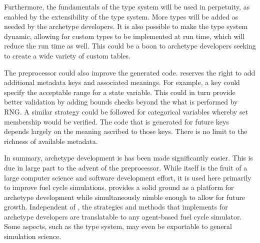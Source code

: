 Furthermore, the fundamentals of the \cyclus type system will be used in
perpetuity, as enabled by the extensibility of the type system.  More types
will be added as needed by the archetype developers.  It is also possible to
make the type system dynamic, allowing for custom types to be implemented at run time,
which will reduce the run time as well.
This could be a boon to archetype developers seeking to create a wide variety of custom
tables.

The preprocessor could also improve the generated code. \Cyclus reserves the right
to add additional metadata keys and associated meanings.  For example, a 
key could specify the acceptable range for a state variable. This could in turn
provide better validation by adding bounds checks beyond the what is performed
by \gls{RNG}. A similar strategy could be followed for categorical variables whereby
set membership would be verified. The code that is generated for future keys
depends largely on the meaning ascribed to those keys. There is no limit
to the richness of available metadata.

In summary, archetype development is has been made significantly easier. This is due in large
part to the advent of the \cyclus preprocessor. While \cycpp itself is the fruit of
a large computer science and software development effort, it is used here
primarily to improve fuel cycle simulations. \cyclus provides a solid ground
as a platform for archetype development while simultaneously nimble enough
to allow for future growth. Independent of \cyclus, the strategies and methods that
\cyclus implements for archetype developers are translatable to any agent-based
fuel cycle simulator.  Some aspects, such as the type system,  may even be exportable
to general simulation science.

